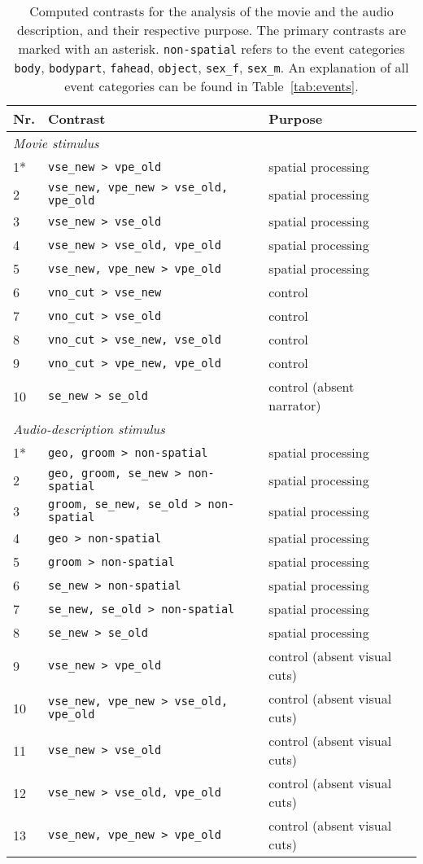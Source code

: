 \documentclass[english,11pt]{article}
\begin{document}
\begin{table*}[tbp]
  \caption{Computed contrasts for the analysis of the movie and the audio
    description, and their respective purpose.
    The primary contrasts are marked with an asterisk.
    \texttt{non-spatial} refers to the event categories
    \texttt{body}, \texttt{bodypart}, \texttt{fahead},
    \texttt{object}, \texttt{sex\_f}, \texttt{sex\_m}.
    An explanation of all event categories can be found in
    Table~\ref{tab:events}.
    }
\label{tab:contrasts}
\begin{tabular}{lll}
\toprule
\textbf{Nr.} &  \textbf{Contrast} & \textbf{Purpose} \\
\midrule
\multicolumn{3}{l}{\textit{Movie stimulus}}\\
1* & \texttt{vse\_new > vpe\_old} & spatial processing \tabularnewline
2 & \texttt{vse\_new, vpe\_new > vse\_old, vpe\_old} & spatial processing \tabularnewline
3 & \texttt{vse\_new > vse\_old} & spatial processing \tabularnewline
4 & \texttt{vse\_new > vse\_old, vpe\_old} & spatial processing \tabularnewline
5 & \texttt{vse\_new, vpe\_new > vpe\_old} & spatial processing \tabularnewline
6 & \texttt{vno\_cut > vse\_new} & control \tabularnewline
7 & \texttt{vno\_cut > vse\_old} & control \tabularnewline
8 & \texttt{vno\_cut > vse\_new, vse\_old} & control \tabularnewline
9 & \texttt{vno\_cut > vpe\_new, vpe\_old} & control \tabularnewline
    10 & \texttt{se\_new > se\_old} & control (absent narrator) \tabularnewline
\midrule
\multicolumn{3}{l}{\textit{Audio-description stimulus}}\\
1* & \texttt{geo, groom > non-spatial} & spatial processing \tabularnewline
2 & \texttt{geo, groom, se\_new > non-spatial} & spatial processing \tabularnewline
3 & \texttt{groom, se\_new, se\_old > non-spatial}  & spatial processing \tabularnewline
4 & \texttt{geo > non-spatial} & spatial processing \tabularnewline
5 & \texttt{groom > non-spatial} & spatial processing \tabularnewline
6 & \texttt{se\_new > non-spatial} & spatial processing \tabularnewline
7 & \texttt{se\_new, se\_old > non-spatial} & spatial processing \tabularnewline
8 & \texttt{se\_new > se\_old} & spatial processing \tabularnewline
9 & \texttt{vse\_new > vpe\_old} & control (absent visual cuts) \tabularnewline
10 & \texttt{vse\_new, vpe\_new > vse\_old, vpe\_old} & control (absent visual cuts) \tabularnewline
11 & \texttt{vse\_new > vse\_old} & control (absent visual cuts) \tabularnewline
12 & \texttt{vse\_new > vse\_old, vpe\_old} & control (absent visual cuts) \tabularnewline
13 & \texttt{vse\_new, vpe\_new > vpe\_old} & control (absent visual cuts) \tabularnewline
\bottomrule
\end{tabular}
\end{table*}
\end{document}
